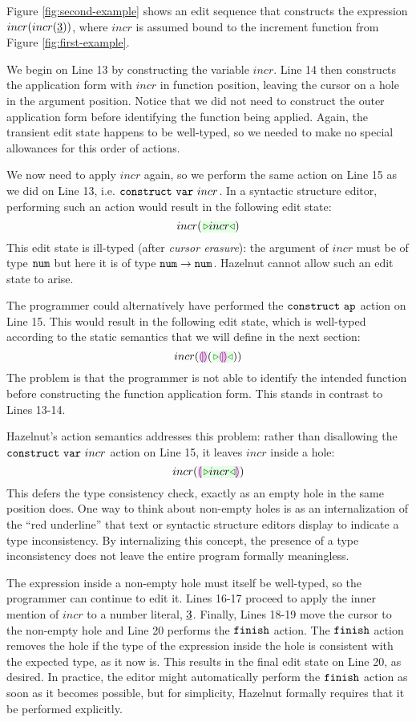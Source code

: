 Figure \ref{fig:second-example} shows an edit sequence that constructs the expression $incr(incr(\underline{3}))$, where $incr$ is assumed bound to the increment function from Figure \ref{fig:first-example}.

We begin on Line 13 by constructing the variable $incr$. Line 14 then constructs the application form with $incr$ in function position, leaving the cursor on a hole in the argument position. Notice that we did not need to construct the outer application form before identifying the function being applied. Again, the transient edit state happens to be well-typed, so we needed to make no special allowances for this order of actions.

We now need to apply $incr$ again, so we perform the same action on Line 15 as we did on Line 13, i.e. $\mathtt{construct}~\mathtt{var}~incr$. In a syntactic structure editor, performing such an action would result in the following edit state: 
\[
incr(\zwsel{incr})
\]
This edit state is ill-typed (after \emph{cursor erasure}): the argument of $incr$ must be of type $\texttt{num}$ but here it is of type $\texttt{num} \rightarrow \texttt{num}$. Hazelnut cannot allow such an edit state to arise. 

The programmer could alternatively have performed the $\mathtt{construct}~\mathtt{ap}$ action on Line 15. This would result in the following edit state, which is well-typed according to the static semantics that we will define in the next section:
\[
incr(\hhole{}(\zwsel{\hhole{}}))
\]
The problem is that the programmer is not able to identify the intended function before constructing the function application form. This stands in contrast to Lines 13-14. %

Hazelnut's action semantics addresses this problem: rather than disallowing the $\mathtt{construct}~\mathtt{var}~incr$ action on Line 15, it leaves $incr$ inside a hole:
\[
incr(\hhole{\zwsel{incr}})
\]
This defers the type consistency check, exactly as an empty hole in the same position does. One way to think about non-empty holes is as an internalization of the ``red underline'' that text or syntactic structure editors display to indicate a type inconsistency. By internalizing this concept, the presence of a type inconsistency does not leave the entire program formally meaningless.

The expression inside a non-empty hole must itself be well-typed, so the programmer can continue to edit it. Lines 16-17 proceed to apply the inner mention of $incr$ to a number literal, $\underline{3}$. Finally, Lines 18-19 move the cursor to the non-empty hole and Line 20 performs the $\mathtt{finish}$ action. The $\mathtt{finish}$ action removes the hole if the type of the expression inside the hole is consistent with the expected type, as it now is. This results in the final edit state on Line 20, as desired. In practice, the editor might automatically perform the $\mathtt{finish}$ action as soon as it becomes possible, but for simplicity, Hazelnut formally requires that it be performed explicitly.

